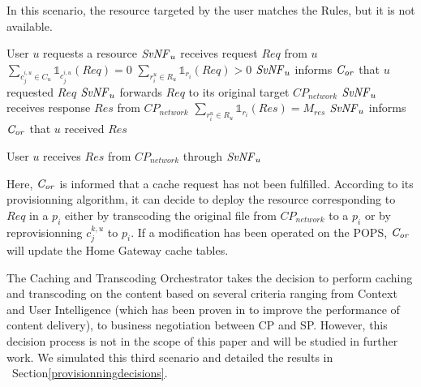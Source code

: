 In this scenario, the resource targeted by the user matches the Rules, but it is not available.

\begin{algorithmic}[1]
\STATE User $u$ requests a resource
\STATE $\mathit{SvNF}_{u}$ receives request $\mathit{Req}$ from $u$
\STATE \( \sum_{c^{i,u}_{j}\in C_{u}}{\mathbb{1}_{c^{i,u}_{j}}(\mathit{Req})} = 0 \)
\STATE \( \sum_{r^{u}_{i}\in R_{u}}{\mathbb{1}_{r_{i}}(\mathit{Req})} > 0  \)
\STATE $\mathit{SvNF}_{u}$ informs $\mathit{C_{or}}$ that $u$ requested $\mathit{Req}$
\ENDIF
\STATE $\mathit{SvNF}_{u}$ forwards $\mathit{Req}$ to its original target \(\mathit{CP}_{\mathit{network}}\)
\STATE $\mathit{SvNF}_{u}$ receives response $\mathit{Res}$ from \(\mathit{CP}_{\mathit{network}}\)
	\STATE \( \sum_{r^{u}_{i}\in R_{u}}{\mathbb{1}_{r_{i}}(\mathit{Res})}=M_{res}\) 
	\STATE $\mathit{SvNF}_{u}$ informs $\mathit{C_{or}}$ that $u$ received $\mathit{Res}$
	\ENDIF
\ENDIF

 
\STATE User $u$ receives $\mathit{Res}$ from \(\mathit{CP}_{\mathit{network}}\) through $\mathit{SvNF}_{u}$
\end{algorithmic}

Here, $\mathit{C_{or}}$ is informed that a cache request has not been fulfilled. According to its provisionning algorithm, it can decide to deploy the resource corresponding to $\mathit{Req}$ in a $p_{i}$ either by transcoding the original file from \(\mathit{CP}_{\mathit{network}}\) to a $p_{i}$ or by reprovisionning $c^{k,u}_{j}$ to $p_{i}$.
If a modification has been operated on the POPS, $\mathit{C_{or}}$ will update the Home Gateway cache tables.

The Caching and Transcoding Orchestrator takes the decision to perform caching and transcoding on the content based on several criteria ranging from Context and User Intelligence (which has been proven in \cite{wang_cpcdn:_2015} to improve the performance of content delivery), to business negotiation between CP and SP.
However, this decision process is not in the scope of this paper and will be studied in further work. 
We simulated this third scenario and detailed the results in ~Section\ref{provisionningdecisions}.


